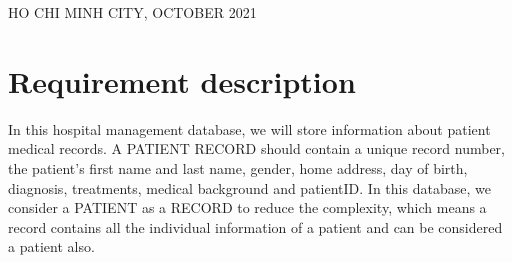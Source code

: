 \documentclass[a4paper]{article}
\numberwithin{equation}{section}
\begin{document}
\begin{titlepage}
  \begin{center}
    {\footnotesize \large HO CHI MINH CITY, OCTOBER 2021}
  \end{center}
\end{titlepage}


\newpage
\tableofcontents
\newpage


\section{Requirement description}

In this hospital management database, we will store information about patient medical records.
A PATIENT RECORD should contain a unique record number, the patient's first name and last name, gender, home address, day of birth, diagnosis, treatments, medical background and patientID\@.
In this database, we consider a PATIENT as a RECORD to reduce the complexity, which means a record contains all the individual information of a patient and can be considered a patient also.
\end{document}

